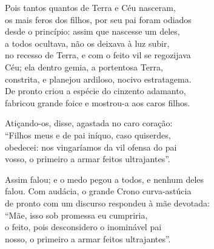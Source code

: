 \quad{}Pois tantos quantos de Terra e Céu nasceram,\\
os mais feros dos filhos, por seu pai foram odiados \\
desde o princípio: assim que nascesse um deles,\\
a todos ocultava, não os deixava à luz subir,\\
no recesso de Terra, e com o feito vil se regozijava\\
Céu; ela dentro gemia, a portentosa Terra,\\
constrita, e planejou ardiloso, nocivo estratagema. \\
De pronto criou a espécie do cinzento adamanto,\\
fabricou grande foice e mostrou-a aos caros filhos.

\quad{}Atiçando-os, disse, agastada no caro coração:\\
``Filhos meus e de pai iníquo, caso quiserdes,\\
obedecei: nos vingaríamos da vil ofensa do pai \\
vosso, o primeiro a armar feitos ultrajantes''.

\quad{}Assim falou; e o medo pegou a todos, e nenhum deles\\
falou. Com audácia, o grande Crono curva-astúcia\\
de pronto com um discurso respondeu à mãe devotada:\\
``Mãe, isso sob promessa eu cumpriria, \\
o feito, pois desconsidero o inominável pai\\
nosso, o primeiro a armar feitos ultrajantes''.

